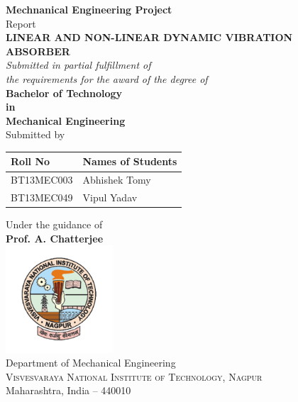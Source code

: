 %
%
%
\begin{titlepage}
\boxit
\begin{center}
\textup{ {\bf Mechnanical Engineering Project} \\ Report}\\[0.2in]
\huge \textbf {\color{red}\uppercase{Linear and Non-linear Dynamic Vibration \\Absorber}}\\
       \small \emph{Submitted in partial fulfillment of\\
       the requirements for the award of the degree of}\\[0.1in]

	{\bf \color{blue} Bachelor of Technology \\in\\ Mechanical Engineering}\\[0.2in]

\normalsize Submitted by \\
\begin{table}[h]
\centering
\begin{tabular}{ll}\hline 
Roll No & Names of Students \\  \hline
BT13MEC003 & Abhishek Tomy\\
BT13MEC049 & Vipul Yadav
 \\  \hline 
\end{tabular}
\end{table}

Under the guidance of\\
{\textbf{Prof. A. Chatterjee}}\\[0.2in]

\includegraphics[width=0.3\textwidth]{"figures/vnitLogo"}\\[0.1in]
\Large{Department of Mechanical Engineering}\\
\normalsize
\textsc{Visvesvaraya National Institute of Technology, Nagpur}\\
Maharashtra, India -- 440010 \\
\end{center}

\end{titlepage}

